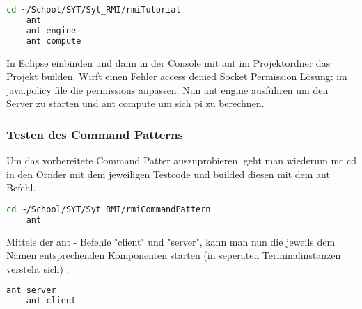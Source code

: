 \begin{lstlisting}[caption=Builden mit ant, language=bash]
	cd ~/School/SYT/Syt_RMI/rmiTutorial
	ant 
	ant engine
	ant compute
\end{lstlisting}

%

%

In Eclipse einbinden und dann in der Console mit 
ant im Projektordner das Projekt builden.
Wirft einen Fehler access denied Socket Permission
Lösung: im java.policy file die permissions anpassen.
Nun ant engine ausführen um den Server zu starten und
ant compute um sich pi zu berechnen.

\subsubsection{Testen des Command Patterns}

Um das vorbereitete Command Patter auszuprobieren, geht man wiederum mc cd in den Ornder mit dem jeweiligen Testcode und builded diesen mit dem ant Befehl.

\begin{lstlisting}[caption=Builden des Command Pattern Testcodes, language=bash]
	cd ~/School/SYT/Syt_RMI/rmiCommandPattern
	ant
\end{lstlisting}

Mittels der ant - Befehle "client" und "server", kann man nun die jeweils dem Namen entsprechenden Komponenten starten (in seperaten Terminalinstanzen versteht sich) .

\begin{lstlisting}[caption=Ausführen des Testcodes des Command Patterns, language=bash]
	ant server
	ant client
\end{lstlisting}


